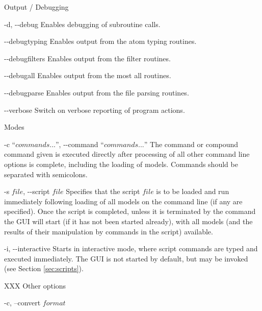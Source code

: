 \begin{optlist}{Output / Debugging}

	\item[-d, {-}{-}debug\its]
		Enables debugging of subroutine calls.
	
	\item[{-}{-}debugtyping\its]
		Enables output from the atom typing routines.
	
	\item[{-}{-}debugfilters\its]
		Enables output from the filter routines.
	
	\item[{-}{-}debugall\its]
		Enables output from the most all routines.

	\item[{-}{-}debugparse\its]
		Enables output from the file parsing routines.
		
	\item[{-}{-}verbose\its]
		Switch on verbose reporting of program actions.

\end{optlist}

\begin{optlist}{Modes}

	\item[-c ``$commands...$'', {-}{-}command ``$commands...$''\its]
		The command or compound command given is executed directly after processing of all other command line options is complete, including the loading of models. Commands should be separated with semicolons.

	\item[-s $file$, {-}{-}script $file$\its]
		Specifies that the script $file$ is to be loaded and run immediately following loading of all models on the command line (if any are specified). Once the script is completed, unless it is terminated by the  command the GUI will start (if it has not been started already), with all models (and the results of their manipulation by commands in the script) available.

	\item[-i, {-}{-}interactive\its]
		Starts \progname{} in interactive mode, where script commands are typed and executed immediately. The GUI is not started by default, but may be invoked (see Section \ref{sec:scripts}).
 
\end{optlist}


XXX Other options

-c, --convert $format$ 
